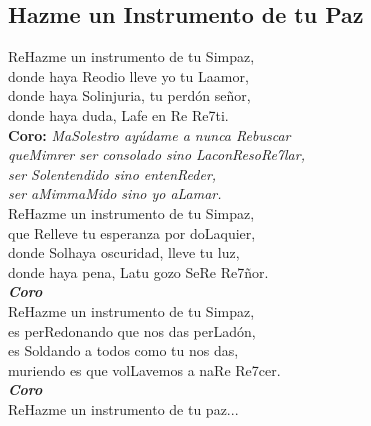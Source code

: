 \subsection{Hazme un Instrumento de tu Paz}\vspace{-15pt}
\begin{center}
{\Large
\ac{Re}Hazme un instrumento de tu \ac{Sim}paz,\\
donde haya \ac{Re}odio lleve yo tu \ac{La}amor,\\
donde haya \ac{Sol}injuria, tu perdón señor,\\
donde haya duda, \ac{La}fe en \ac{Re    Re7}ti.\\
\textbf{Coro:} \textit{Ma\ac{Sol}estro ayúdame a nunca \ac{Re}buscar}\\
\textit{que\ac{Mim}rer ser consolado sino \ac{La}con\ac{Re}so\ac{Re7}lar,}\\
\textit{ser \ac{Sol}entendido sino enten\ac{Re}der,}\\
\textit{ser a\ac{Mim}ma\ac{Mi}do sino yo a\ac{La}mar.}\\
\ac{Re}Hazme un instrumento de tu \ac{Sim}paz,\\
que \ac{Re}lleve tu esperanza por do\ac{La}quier,\\
donde \ac{Sol}haya oscuridad, lleve tu luz,\\
donde haya pena, \ac{La}tu gozo Se\ac{Re    Re7}ñor.\\
\textit{\textbf{Coro}}\\\vspace{-10pt}
\ac{Re}Hazme un instrumento de tu \ac{Sim}paz,\\
es per\ac{Re}donando que nos das per\ac{La}dón,\\
es \ac{Sol}dando a todos como tu nos das,\\
muriendo es que vol\ac{La}vemos a na\ac{Re    Re7}cer.\\
\textit{\textbf{Coro}}\\\vspace{-10pt}
\ac{Re}Hazme un instrumento de tu paz...
}
\end{center}
